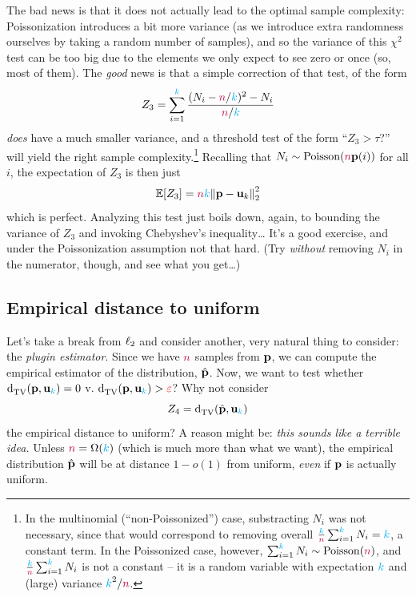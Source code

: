 The bad news is that it does not actually lead to the optimal sample complexity: Poissonization introduces a bit more variance (as we introduce extra randomness ourselves by taking a random number of samples), and so the variance of this $\chi^2$ test can be too big due to the elements we only expect to see zero or once (so, most of them). The \emph{good} news is that a simple correction of that test, of the form
\begin{equation}
    Z_3 = \sum_{i=1}^\ab \frac{(N_i-\ns/\ab)^2- N_i}{\ns/\ab}
\end{equation}
\emph{does} have a much smaller variance, and a threshold test of the form ``$Z_3 > \tau$?'' will yield the right sample complexity.\footnote{In the multinomial (``non-Poissonized'') case, substracting $N_i$ was not necessary, since that would correspond to removing overall $\frac{\ab}{\ns}\sum_{i=1}^\ab N_i = \ab$, a constant term. In the Poissonized case, however, $\sum_{i=1}^\ab N_i\sim\poisson{\ns}$, and $\frac{\ab}{\ns}\sum_{i=1}^\ab N_i$ is not a constant -- it is a random variable with expectation $\ab$ and (large) variance $\ab^2/\ns$.} Recalling that $N_i\sim\poisson{\ns\p(i)}$ for all $i$, the expectation of $Z_3$ is then just 
\[
    \expect{Z_3} = \ns\ab \normtwo{\p-\uniform_k}^2
\]
which is perfect. Analyzing this test just boils down, again, to bounding the variance of $Z_3$ and invoking Chebyshev's inequality\dots{} It's a good exercise, and under the Poissonization assumption not that hard. (Try \emph{without} removing $N_i$ in the numerator, though, and see what you get\dots)

\subsection{Empirical distance to uniform} Let's take a break from $\lp[2]$ and consider another, very natural thing to consider: the \emph{plugin estimator}. Since we have $\ns$ samples from $\p$, we can compute the empirical estimator of the distribution, $\hat{\p}$. Now, we want to test whether $\totalvardist{\p}{\uniform_\ab}=0$ v. $\totalvardist{\p}{\uniform_\ab}>\dst$? Why not consider 
\begin{equation}
    Z_4 = \totalvardist{\hat{\p}}{\uniform_\ab}
\end{equation}
the empirical distance to uniform? A reason might be: \emph{this sounds like a terrible idea.} Unless $\ns = \Omega(\ab)$ (which is much more than what we want), the empirical distribution $\hat{\p}$ will be at distance $1-o(1)$ from uniform, \emph{even} if $\p$ is actually uniform. 


